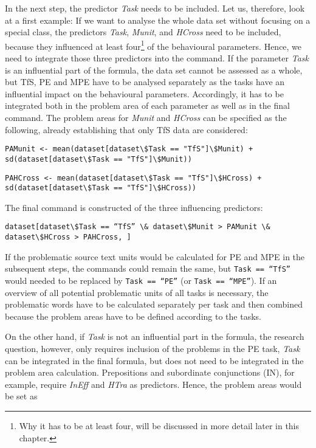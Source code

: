 In the next step, the predictor \textit{Task} needs to be included. Let us, therefore, look at a first example: If we want to analyse the whole data set without focusing on a special  class, the predictors \textit{Task}, \textit{Munit}, and \textit{HCross} need to be included, because they influenced at least four\footnote{Why it has to be at least four, will be discussed in more detail later in this chapter.} of the behavioural parameters. Hence, we need to integrate those three predictors into the command. If the parameter \textit{Task} is an influential part of the formula, the data set cannot be assessed as a whole, but TfS, PE and MPE have to be analysed separately as the tasks have an influential impact on the behavioural parameters. Accordingly, it has to be integrated both in the problem area of each parameter as well as in the final command. The problem areas for \textit{Munit} and \textit{HCross} can be specified as the following, already establishing that only TfS data are considered:


\ea\begin{lstlisting}
PAMunit <- mean(dataset[dataset\$Task == "TfS"]\$Munit) + sd(dataset[dataset\$Task == "TfS"]\$Munit))
\end{lstlisting}\z

\ea\begin{lstlisting}
PAHCross <- mean(dataset[dataset\$Task == "TfS"]\$HCross) + sd(dataset[dataset\$Task == "TfS"]\$HCross))
\end{lstlisting}\z


The final command is constructed of the three influencing predictors:


\ea\begin{lstlisting}
dataset[dataset\$Task == “TfS” \& dataset\$Munit > PAMunit \& dataset\$HCross > PAHCross, ]
\end{lstlisting}\z


If the problematic source text units would be calculated for PE and MPE in the subsequent steps, the commands could remain the same, but \texttt{Task == “TfS”} would needed to be replaced by \texttt{Task == “PE”} (or \texttt{Task == “MPE”}). If an overview of all potential problematic units of all tasks is necessary, the problematic words have to be calculated separately per task and then combined because the problem areas have to be defined according to the tasks.



On the other hand, if \textit{Task} is not an influential part in the formula, the research question, however, only requires inclusion of the problems in the PE task, \textit{Task} can be integrated in the final formula, but does not need to be integrated in the problem area calculation. Prepositions and subordinate conjunctions (IN), for example, require \textit{InEff} and \textit{HTra} as predictors. Hence, the problem areas would be set as

